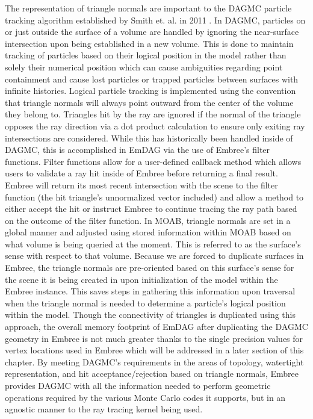 The representation of triangle normals are important to the DAGMC particle
tracking algorithm established by Smith et. al. in 2011 \cite{Smith_2011}. In
DAGMC, particles on or just outside the surface of a volume are handled by
ignoring the near-surface intersection upon being established in a new
volume. This is done to maintain tracking of particles based on their logical
position in the model rather than solely their numerical position which can
cause ambiguities regarding point containment and cause lost particles or
trapped particles between surfaces with infinite histories. Logical particle
tracking is implemented using the convention that triangle normals will always
point outward from the center of the volume they belong to. Triangles hit by the
ray are ignored if the normal of the triangle opposes the ray direction via a
dot product calculation to ensure only exiting ray intersections are
considered. While this has historically been handled inside of DAGMC, this is
accomplished in EmDAG via the use of Embree's filter functions. Filter functions
allow for a user-defined callback method which allows users to validate a ray
hit inside of Embree before returning a final result. Embree will return its
most recent intersection with the scene to the filter function (the hit
triangle's unnormalized vector included) and allow a method to either accept the
hit or instruct Embree to continue tracing the ray path based on the outcome of
the filter function. In MOAB, triangle normals are set in a global manner and
adjusted using stored information within MOAB based on what volume is being
queried at the moment. This is referred to as the surface's sense with respect
to that volume. Because we are forced to duplicate surfaces in Embree, the
triangle normals are pre-oriented based on this surface's sense for the scene it
is being created in upon initialization of the model within the Embree
instance. This saves steps in gathering this information upon traversal when the
triangle normal is needed to determine a particle's logical position within the
model. Though the connectivity of triangles is duplicated using this approach,
the overall memory footprint of EmDAG after duplicating the DAGMC geometry in
Embree is not much greater thanks to the single precision values for vertex
locations used in Embree which will be addressed in a later section of this
chapter.  By meeting DAGMC's requirements in the areas of topology, watertight
representation, and hit acceptance/rejection based on triangle normals, Embree
provides DAGMC with all the information needed to perform geometric operations
required by the various Monte Carlo codes it supports, but in an agnostic manner
to the ray tracing kernel being used.

